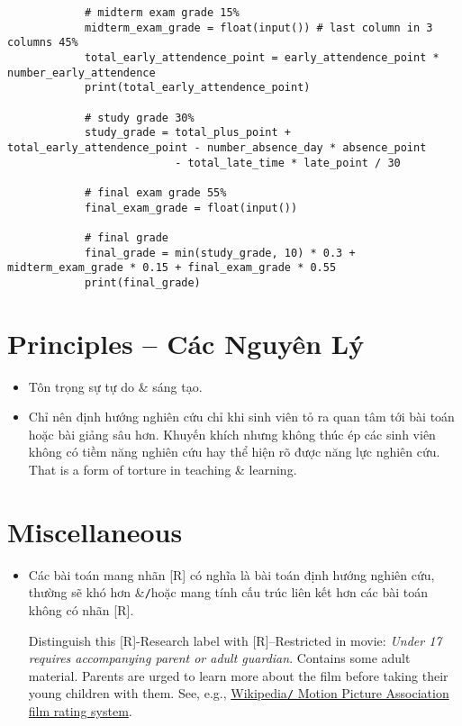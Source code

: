 \documentclass{article}
\begin{document}
\begin{itemize}
\begin{verbatim}
		    # midterm exam grade 15%
		    midterm_exam_grade = float(input()) # last column in 3 columns 45%
		    total_early_attendence_point = early_attendence_point * number_early_attendence
		    print(total_early_attendence_point)
		
		    # study grade 30%
		    study_grade = total_plus_point + total_early_attendence_point - number_absence_day * absence_point
		                  - total_late_time * late_point / 30
		
		    # final exam grade 55%
		    final_exam_grade = float(input())
		
		    # final grade
		    final_grade = min(study_grade, 10) * 0.3 + midterm_exam_grade * 0.15 + final_exam_grade * 0.55
		    print(final_grade)
	\end{verbatim}
\end{itemize}


\section{Principles -- Các Nguyên Lý}

\begin{itemize}
	\item Tôn trọng sự tự do \& sáng tạo.
	\item Chỉ nên định hướng nghiên cứu chỉ khi sinh viên tỏ ra quan tâm tới bài toán hoặc bài giảng sâu hơn. Khuyến khích nhưng không thúc ép các sinh viên không có tiềm năng nghiên cứu hay thể hiện rõ được năng lực nghiên cứu. That is a form of torture in teaching \& learning.
\end{itemize}


\section{Miscellaneous}

\begin{itemize}
	\item Các bài toán mang nhãn [R] có nghĩa là bài toán định hướng nghiên cứu, thường sẽ khó hơn \&{\tt/}hoặc mang tính cấu trúc liên kết hơn các bài toán không có nhãn [R].
	
	Distinguish this [R]-Research label with [R]--Restricted in movie: {\it Under 17 requires accompanying parent or adult guardian}. Contains some adult material. Parents are urged to learn more about the film before taking their young children with them. See, e.g., \href{https://en.wikipedia.org/wiki/Motion_Picture_Association_film_rating_system}{Wikipedia{\tt/} Motion Picture Association film rating system}.
\end{itemize}


\printbibliography[heading=bibintoc]
	
\end{document}
